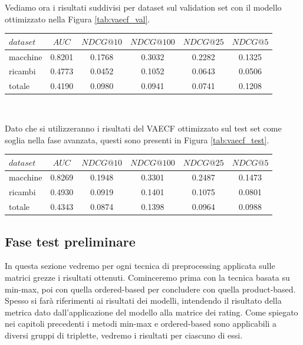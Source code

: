Vediamo ora i risultati suddivisi per dataset sul validation set con il modello ottimizzato nella Figura \ref{tab:vaecf_val}.
\begin{center}
\begin{tabular}{|l|c|cccc|}
    \toprule
    $dataset$ &    $AUC$ &  $NDCG@10$ & $NDCG@100$  & $NDCG@25$ & $NDCG@5$  \\
    \midrule
    macchine & 0.8201 & 0.1768 & 0.3032 & 0.2282 & 0.1325 \\
    ricambi & 0.4773 & 0.0452 & 0.1052 & 0.0643 & 0.0506 \\
    totale  & 0.4190 & 0.0980 & 0.0941 & 0.0741 & 0.1208 \\
\bottomrule
\end{tabular}\\
\label{tab:vaecf_val}
\end{center}
Dato che si utilizzeranno i risultati del VAECF ottimizzato sul test set come soglia nella fase avanzata, questi sono presenti in Figura \ref{tab:vaecf_test}.
\begin{center}
\begin{tabular}{|l|c|cccc|}
    \toprule
    $dataset$ &    $AUC$ &  $NDCG@10$ & $NDCG@100$  & $NDCG@25$ & $NDCG@5$  \\
    \midrule
    macchine & 0.8269 &  0.1948 &   0.3301 &  0.2487 & 0.1473 \\
    ricambi  & 0.4930 &  0.0919 &   0.1401 &  0.1075 & 0.0801 \\
    totale  & 0.4343 &  0.0874 &   0.1398 &  0.0964 & 0.0988 \\

\bottomrule
\end{tabular}
\label{tab:vaecf_test}
\end{center}

\subsection{Fase test preliminare}
In questa sezione vedremo per ogni tecnica di preprocessing applicata sulle matrici grezze i risultati ottenuti.
Cominceremo prima con la tecnica basata su min-max, poi con quella ordered-based per concludere con quella product-based. 
Spesso si farà riferimenti ai risultati dei modelli, intendendo il risultato della metrica dato dall'applicazione del modello alla matrice dei rating.
Come spiegato nei capitoli precedenti i metodi min-max e ordered-based sono applicabili a diversi gruppi di triplette, vedremo i risultati per ciascuno di essi.\\

